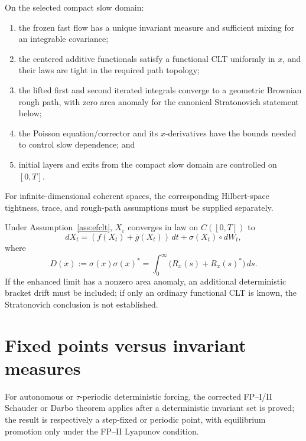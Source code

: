 \documentclass[11pt]{article}
\begin{document}
\begin{assumption}\label{ass:efclt}
On the selected compact slow domain:
\begin{enumerate}[label=\textup{(H\arabic*)}]
\item the frozen fast flow has a unique invariant measure and sufficient
mixing for an integrable covariance;
\item the centered additive functionals satisfy a functional CLT uniformly in
$x$, and their laws are tight in the required path topology;
\item the lifted first and second iterated integrals converge to a geometric
Brownian rough path, with zero area anomaly for the canonical Stratonovich
statement below;
\item the Poisson equation/corrector and its $x$-derivatives have the bounds
needed to control slow dependence; and
\item initial layers and exits from the compact slow domain are controlled on
$[0,T]$.
\end{enumerate}
For infinite-dimensional coherent spaces, the corresponding Hilbert-space
tightness, trace, and rough-path assumptions must be supplied separately.
\end{assumption}

\begin{theorem}\label{thm:homogen}
Under Assumption~\ref{ass:efclt}, $X_\varepsilon$ converges in law on
$C([0,T])$ to
\[
dX_t=(f(X_t)+\bar g(X_t))\,dt+\sigma(X_t)\circ dW_t,
\]
where
\begin{equation}
D(x):=\sigma(x)\sigma(x)^\ast
=\int_0^\infty\bigl(R_x(s)+R_x(s)^\ast\bigr)\,ds.
\label{eq:green-kubo}
\end{equation}
If the enhanced limit has a nonzero area anomaly, an additional deterministic
bracket drift must be included; if only an ordinary functional CLT is known,
the Stratonovich conclusion is not established.
\end{theorem}

\section{Fixed points versus invariant measures}

For autonomous or $\tau$-periodic deterministic forcing, the corrected
FP--I/II Schauder or Darbo theorem applies after a deterministic invariant set
is proved; the result is respectively a step-fixed or periodic point, with
equilibrium promotion only under the FP--II Lyapunov condition.
\end{document}
